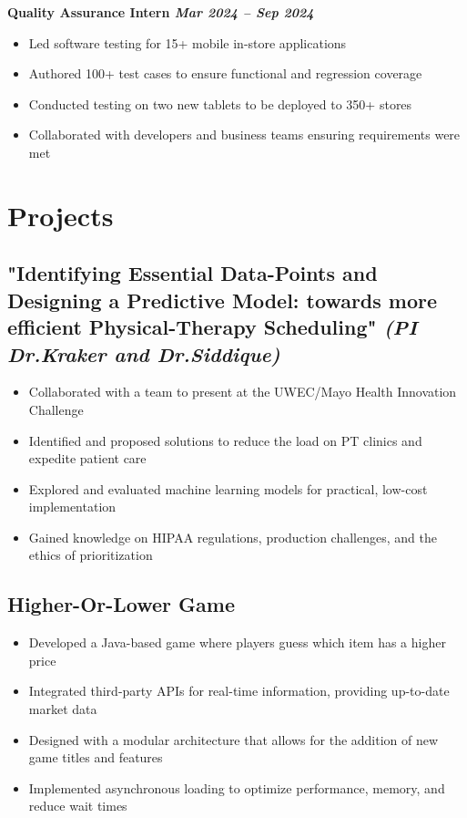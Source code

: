 \documentclass[a4paper,10pt]{article}
\begin{document}
\hspace{12pt}\textbf{{Quality Assurance Intern} \hfill \textit{Mar 2024 – Sep 2024}} \\
\vspace{-1em}
{\fontsize{12}{15}\selectfont
\begin{itemize}[leftmargin=30pt]
    \item Led software testing for 15+ mobile in-store applications
    \item Authored 100+ test cases to ensure functional and regression coverage
    \item Conducted testing on two new tablets to be deployed to 350+ stores
    \item Collaborated with developers and business teams ensuring requirements were met
\end{itemize}
}


\section*{Projects}
\subsection*{{\fontsize{12}{15}\selectfont "Identifying Essential Data-Points and Designing a Predictive Model: towards more efficient Physical-Therapy Scheduling"   } \normalsize \textit{(PI Dr.Kraker and Dr.Siddique)}}
{\fontsize{12}{15}\selectfont
\begin{itemize}[leftmargin=30pt]
    \item Collaborated with a team to present at the UWEC/Mayo Health Innovation Challenge
    \item Identified and proposed solutions to reduce the load on PT clinics and expedite patient care
    \item Explored and evaluated machine learning models for practical, low-cost implementation
    \item Gained knowledge on HIPAA regulations, production challenges, and the ethics of prioritization
\end{itemize}
}
\subsection*{Higher-Or-Lower Game}
{\fontsize{12}{15}\selectfont
\begin{itemize}[leftmargin=30pt]
    \item Developed a Java-based game where players guess which item has a higher price
    \item Integrated third-party APIs for real-time information, providing up-to-date market data 
    \item Designed with a modular architecture that allows for the addition of new game titles and features
    \item Implemented asynchronous loading to optimize performance, memory, and reduce wait times
\end{itemize}
}
\end{document}
